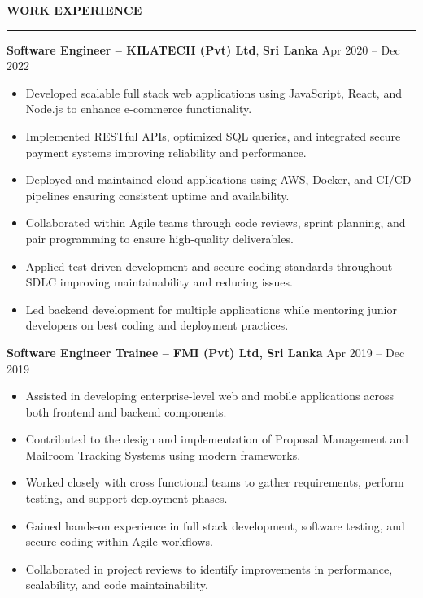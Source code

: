 \documentclass[10pt,letterpaper]{article}
\begin{document}
\vspace{8pt}

\textbf{WORK EXPERIENCE}\\[-8pt]
\noindent\rule{\textwidth}{1pt}

\vspace{-2pt}

\textbf{Software Engineer -- KILATECH (Pvt) Ltd}, \textbf{Sri Lanka} \hfill Apr 2020 -- Dec 2022

\vspace{-1pt}

\begin{itemize}
\item Developed scalable full stack web applications using JavaScript, React, and Node.js to enhance e-commerce functionality.
\item Implemented RESTful APIs, optimized SQL queries, and integrated secure payment systems improving reliability and performance.
\item Deployed and maintained cloud applications using AWS, Docker, and CI/CD pipelines ensuring consistent uptime and availability.
\item Collaborated within Agile teams through code reviews, sprint planning, and pair programming to ensure high-quality deliverables.
\item Applied test-driven development and secure coding standards throughout SDLC improving maintainability and reducing issues.
\item Led backend development for multiple applications while mentoring junior developers on best coding and deployment practices.
\end{itemize}

\textbf{Software Engineer Trainee -- FMI (Pvt) Ltd, Sri Lanka} \hfill Apr 2019 -- Dec 2019

\vspace{-1pt}

\begin{itemize}
\item Assisted in developing enterprise-level web and mobile applications across both frontend and backend components.
\item Contributed to the design and implementation of Proposal Management and Mailroom Tracking Systems using modern frameworks.
\item Worked closely with cross functional teams to gather requirements, perform testing, and support deployment phases.
\item Gained hands-on experience in full stack development, software testing, and secure coding within Agile workflows.
\item Collaborated in project reviews to identify improvements in performance, scalability, and code maintainability.
\end{itemize}
\end{document}
